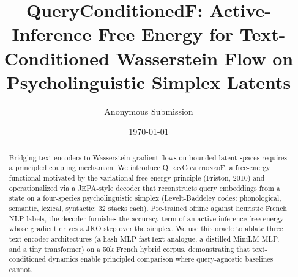 \documentclass[a4paper,11pt]{article}
\title{QueryConditionedF: Active-Inference Free Energy for Text-Conditioned Wasserstein Flow on Psycholinguistic Simplex Latents}
\author{Anonymous Submission}
\date{\today}
\begin{document}
\maketitle

\begin{abstract}
Bridging text encoders to Wasserstein gradient flows on bounded latent spaces requires a principled coupling mechanism. We introduce \textsc{QueryConditionedF}, a free-energy functional motivated by the variational free-energy principle (Friston, 2010) and operationalized via a JEPA-style decoder that reconstructs query embeddings from a state on a four-species psycholinguistic simplex (Levelt-Baddeley codes: phonological, semantic, lexical, syntactic; 32 stacks each). Pre-trained offline against heuristic French NLP labels, the decoder furnishes the accuracy term of an active-inference free energy whose gradient drives a JKO step over the simplex. We use this oracle to ablate three text encoder architectures (a hash-MLP fastText analogue, a distilled-MiniLM MLP, and a tiny transformer) on a 50k French hybrid corpus, demonstrating that text-conditioned dynamics enable principled comparison where query-agnostic baselines cannot.
\end{abstract}










\end{document}
